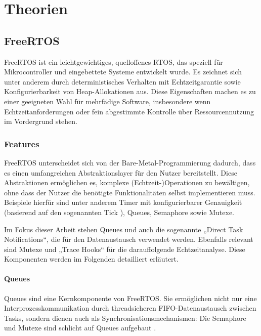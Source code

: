 \section{Theorien}

\subsection{FreeRTOS}

FreeRTOS ist ein leichtgewichtiges, quelloffenes \ac{RTOS}, das speziell für
Mikrocontroller und eingebettete Systeme entwickelt wurde. Es zeichnet sich
unter anderem durch deterministisches Verhalten mit Echtzeitgarantie sowie
Konfigurierbarkeit von Heap-Allokationen aus. Diese Eigenschaften machen es zu
einer geeigneten Wahl für mehrfädige Software, insbesondere wenn
Echtzeitanforderungen oder fein abgestimmte Kontrolle über Ressourcennutzung im
Vordergrund stehen.

\subsubsection{Features}

FreeRTOS unterscheidet sich von der Bare-Metal-Programmierung dadurch, dass es
einen umfangreichen Abstraktionslayer für den Nutzer bereitstellt. Diese
Abstraktionen ermöglichen es, komplexe (Echtzeit-)Operationen zu bewältigen,
ohne dass der Nutzer die benötigte Funktionalitäten selbst implementieren muss.
Beispiele hierfür sind unter anderem Timer mit konfigurierbarer Genauigkeit
(basierend auf den sogenannten Tick \cite{freertos_rtos_tick,
freertos_tick_resolution}), Queues, Semaphore sowie Mutexe.

Im Fokus dieser Arbeit stehen Queues und auch die sogenannte „Direct Task
Notifications“, die für den Datenaustausch verwendet werden. Ebenfalls relevant
sind Mutexe und „Trace Hooks“ für die darauffolgende Echtzeitanalyse. Diese
Komponenten werden im Folgenden detailliert erläutert.

\paragraph{Queues}

Queues sind eine Kernkomponente von FreeRTOS. Sie ermöglichen nicht nur eine
Interprozesskommunikation durch threadsicheren FIFO-Datenaustausch zwischen
Tasks, sondern dienen auch als Synchronisationsmechanismen: Die Semaphore und
Mutexe sind schlicht auf Queues aufgebaut \cite{freertos_semphr_incl}.

